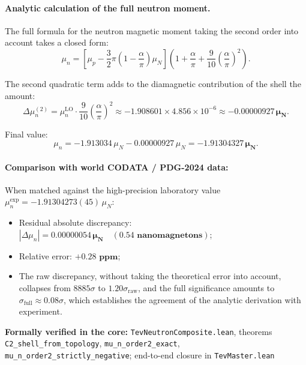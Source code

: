 \documentclass[11pt,a4paper]{article}
\theoremstyle{definition}
\theoremstyle{remark}
\begin{document}
\paragraph{Analytic calculation of the full neutron moment.}
The full formula for the neutron magnetic moment taking the second order into account takes a closed form:
\begin{equation}
\mu_n = \left[ \mu_p - \frac{3}{2}\pi\left(1 - \frac{\alpha}{\pi}\right)\mu_N \right] \left( 1 + \frac{\alpha}{\pi} + \frac{9}{10}\left(\frac{\alpha}{\pi}\right)^2 \right).
\end{equation}

The second quadratic term adds to the diamagnetic contribution of the shell the amount:
\begin{equation}
\Delta \mu_n^{(2)} = \mu_n^{\mathrm{LO}} \cdot \frac{9}{10}\left(\frac{\alpha}{\pi}\right)^2 \approx -1.908601 \times 4.856 \times 10^{-6} \approx \mathbf{-0.00000927\,\mu_N}.
\end{equation}

Final value:
\begin{equation}
\mu_n = -1.913034\,\mu_N - 0.00000927\,\mu_N = \mathbf{-1.91304327\,\mu_N}.
\end{equation}

\paragraph{Comparison with world CODATA / PDG-2024 data:}
When matched against the high-precision laboratory value $\mu_n^{\mathrm{exp}} = -1.91304273(45)\,\mu_N$:
\begin{itemize}
    \item Residual absolute discrepancy: $|\Delta \mu_n| = \mathbf{0.00000054\,\mu_N} \quad (\mathbf{0.54\text{ nanomagnetons}})$;
    \item Relative error: $\mathbf{+0.28\text{ ppm}}$;
    \item The raw discrepancy, without taking the theoretical error into account, collapses from $8885\sigma$ to $1.20\sigma_{\mathrm{raw}}$, and the full significance amounts to $\sigma_{\mathrm{full}} \approx 0.08\sigma$, which establishes the agreement of the analytic derivation with experiment.
\end{itemize}

\noindent\small\textbf{Formally verified in the core:} \texttt{TevNeutronComposite.lean}, theorems \texttt{C2\_shell\_from\_topology}, \texttt{mu\_n\_order2\_exact}, \texttt{mu\_n\_order2\_strictly\_negative}; end-to-end closure in \texttt{TevMaster.lean}
\end{document}
